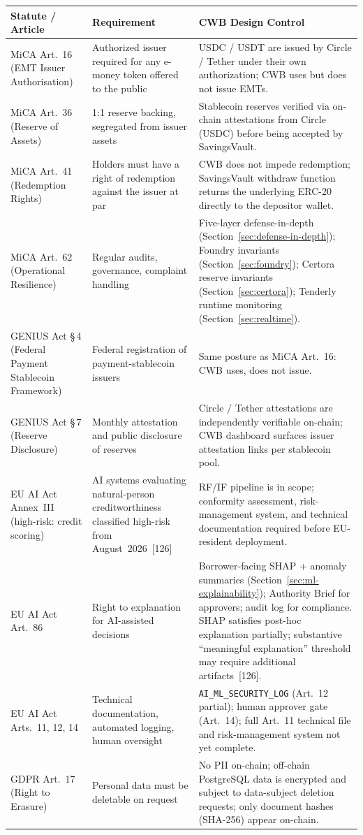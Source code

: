 \documentclass[12pt,a4paper]{report}
\newcommand{\tableheadcolor}{\rowcolor{TableHeadBg}}
\begin{document}
\begin{table}[H]
\centering
\begin{tabular}{p{3.2cm}p{4.6cm}p{5.8cm}}
\toprule
\tableheadcolor
\textbf{Statute / Article} & \textbf{Requirement} & \textbf{CWB Design Control} \\
\midrule
MiCA Art.~16 (EMT Issuer Authorisation) & Authorized issuer required for any e-money token offered to the public & USDC / USDT are issued by Circle / Tether under their own authorization; CWB uses but does not issue EMTs. \\
MiCA Art.~36 (Reserve of Assets) & 1{:}1 reserve backing, segregated from issuer assets & Stablecoin reserves verified via on-chain attestations from Circle (USDC) before being accepted by SavingsVault. \\
MiCA Art.~41 (Redemption Rights) & Holders must have a right of redemption against the issuer at par & CWB does not impede redemption; SavingsVault withdraw function returns the underlying ERC-20 directly to the depositor wallet. \\
MiCA Art.~62 (Operational Resilience) & Regular audits, governance, complaint handling & Five-layer defense-in-depth (Section~\ref{sec:defense-in-depth}); Foundry invariants (Section~\ref{sec:foundry}); Certora reserve invariants (Section~\ref{sec:certora}); Tenderly runtime monitoring (Section~\ref{sec:realtime}). \\
GENIUS Act \S\,4 (Federal Payment Stablecoin Framework) & Federal registration of payment-stablecoin issuers & Same posture as MiCA Art.~16: CWB uses, does not issue. \\
GENIUS Act \S\,7 (Reserve Disclosure) & Monthly attestation and public disclosure of reserves & Circle / Tether attestations are independently verifiable on-chain; CWB dashboard surfaces issuer attestation links per stablecoin pool. \\
EU AI Act Annex~III (high-risk: credit scoring) & AI systems evaluating natural-person creditworthiness classified high-risk from August~2026~[126] & RF/IF pipeline is in scope; conformity assessment, risk-management system, and technical documentation required before EU-resident deployment. \\
EU AI Act Art.~86 & Right to explanation for AI-assisted decisions & Borrower-facing SHAP + anomaly summaries (Section~\ref{sec:ml-explainability}); Authority Brief for approvers; audit log for compliance. SHAP satisfies post-hoc explanation partially; substantive ``meaningful explanation'' threshold may require additional artifacts~[126]. \\
EU AI Act Arts.~11, 12, 14 & Technical documentation, automated logging, human oversight & \texttt{AI\_ML\_SECURITY\_LOG} (Art.~12 partial); human approver gate (Art.~14); full Art.~11 technical file and risk-management system not yet complete. \\
GDPR Art.~17 (Right to Erasure) & Personal data must be deletable on request & No PII on-chain; off-chain PostgreSQL data is encrypted and subject to data-subject deletion requests; only document hashes (SHA-256) appear on-chain. \\
\bottomrule
\end{tabular}
\end{table}
\end{document}
